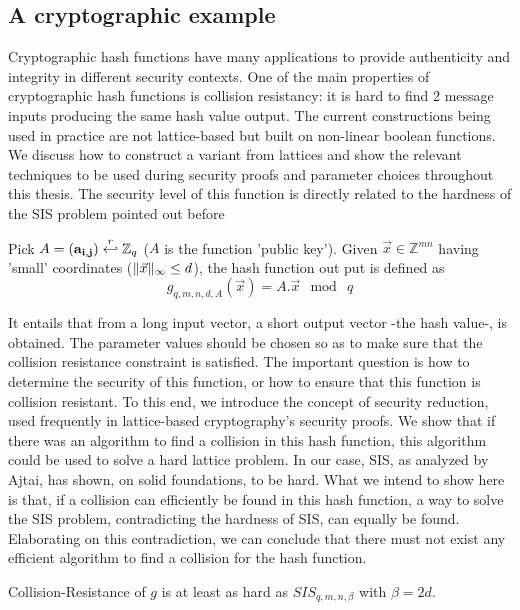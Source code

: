 \subsection{A cryptographic example}
\label{sec:ajtaiHash}
Cryptographic hash functions have many applications to
provide authenticity and integrity in different security contexts. One of the main properties of cryptographic
hash functions is collision resistancy: it is hard to find 2 message inputs
producing the same hash value output. The current constructions being used in practice
are not lattice-based but built on non-linear boolean functions. We discuss how
to construct a variant from lattices and show the relevant techniques
to be used during security proofs and parameter choices throughout this
thesis. The security level of this function is directly related to the hardness of
the SIS problem pointed out before
\begin{definition}
  Pick $A=(\mathbf{a_{i,j}}) \stackrel{r}{\hookleftarrow} \mathbb{Z}_q$ ($A$ is the function
  'public key'). Given $\vec{x} \in \mathbb{Z}^{mn}$ having 'small' coordinates
  ($\Vert \vec{x} \Vert_{\infty} \leq d$), the hash function out put is defined as
  \[
    g_{q,m,n,d,A}(\vec{x}) = A . \vec{x} \mod \ q
  \]
  \label{def:Ajtai's Hash Function}
\end{definition}
It entails that from a long input vector, a short output vector -the hash value-, is obtained. The parameter values should be chosen so as to make sure that the collision resistance constraint is
satisfied. The important question is how to determine the security of this
function, or how to ensure that this function is collision resistant. To this end, we
introduce the concept of security reduction, used frequently in
lattice-based cryptography's security proofs. We show that if there
was an algorithm to find a collision in this hash function, this algorithm could be used
to solve a hard lattice problem. In our case, SIS, as
analyzed by Ajtai, has shown, on solid foundations, to be hard. What we
intend to show here is that, if a collision can efficiently be found in this hash
function, a way to solve the SIS problem, contradicting the hardness of SIS, can equally be found. Elaborating on this contradiction, we can conclude that there must not exist any efficient algorithm to find a collision for the hash function.
\begin{theorem}
  Collision-Resistance of $g$ is at least as hard as $SIS_{q,m,n,\beta}$ with
  $\beta = 2d$.
  \label{the:ajtai hash}
\end{theorem}
